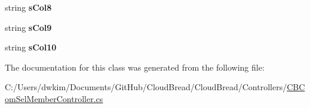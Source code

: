 \begin{DoxyCompactItemize}
\item 
string {\bfseries s\+Col8}\hypertarget{class_cloud_bread_1_1_controllers_1_1_c_b_com_sel_member_controller_1_1_model_ac37b6b37d1de72870edef7e884adab4d}{}\label{class_cloud_bread_1_1_controllers_1_1_c_b_com_sel_member_controller_1_1_model_ac37b6b37d1de72870edef7e884adab4d}

\item 
string {\bfseries s\+Col9}\hypertarget{class_cloud_bread_1_1_controllers_1_1_c_b_com_sel_member_controller_1_1_model_a1feea57babcf0e894567a95ddd1395f6}{}\label{class_cloud_bread_1_1_controllers_1_1_c_b_com_sel_member_controller_1_1_model_a1feea57babcf0e894567a95ddd1395f6}

\item 
string {\bfseries s\+Col10}\hypertarget{class_cloud_bread_1_1_controllers_1_1_c_b_com_sel_member_controller_1_1_model_af1302fc1f27083e108e99d38cda2602a}{}\label{class_cloud_bread_1_1_controllers_1_1_c_b_com_sel_member_controller_1_1_model_af1302fc1f27083e108e99d38cda2602a}

\end{DoxyCompactItemize}


The documentation for this class was generated from the following file\+:\begin{DoxyCompactItemize}
\item 
C\+:/\+Users/dwkim/\+Documents/\+Git\+Hub/\+Cloud\+Bread/\+Cloud\+Bread/\+Controllers/\hyperlink{_c_b_com_sel_member_controller_8cs}{C\+B\+Com\+Sel\+Member\+Controller.\+cs}\end{DoxyCompactItemize}
